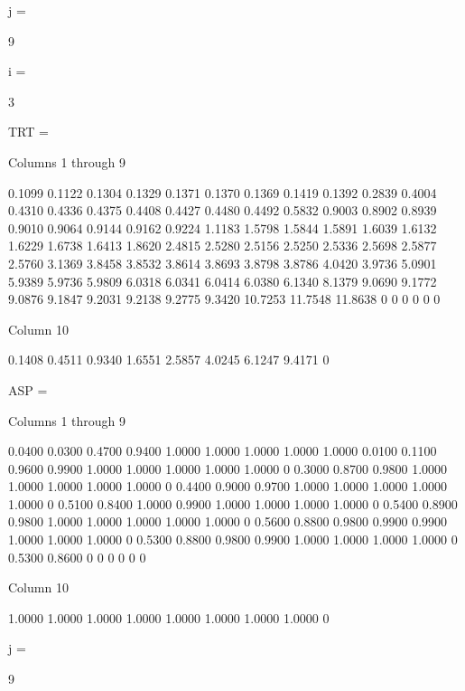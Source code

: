 j =

     9


i =

     3


TRT =

  Columns 1 through 9

    0.1099    0.1122    0.1304    0.1329    0.1371    0.1370    0.1369    0.1419    0.1392
    0.2839    0.4004    0.4310    0.4336    0.4375    0.4408    0.4427    0.4480    0.4492
    0.5832    0.9003    0.8902    0.8939    0.9010    0.9064    0.9144    0.9162    0.9224
    1.1183    1.5798    1.5844    1.5891    1.6039    1.6132    1.6229    1.6738    1.6413
    1.8620    2.4815    2.5280    2.5156    2.5250    2.5336    2.5698    2.5877    2.5760
    3.1369    3.8458    3.8532    3.8614    3.8693    3.8798    3.8786    4.0420    3.9736
    5.0901    5.9389    5.9736    5.9809    6.0318    6.0341    6.0414    6.0380    6.1340
    8.1379    9.0690    9.1772    9.0876    9.1847    9.2031    9.2138    9.2775    9.3420
   10.7253   11.7548   11.8638         0         0         0         0         0         0

  Column 10

    0.1408
    0.4511
    0.9340
    1.6551
    2.5857
    4.0245
    6.1247
    9.4171
         0


ASP =

  Columns 1 through 9

    0.0400    0.0300    0.4700    0.9400    1.0000    1.0000    1.0000    1.0000    1.0000
    0.0100    0.1100    0.9600    0.9900    1.0000    1.0000    1.0000    1.0000    1.0000
         0    0.3000    0.8700    0.9800    1.0000    1.0000    1.0000    1.0000    1.0000
         0    0.4400    0.9000    0.9700    1.0000    1.0000    1.0000    1.0000    1.0000
         0    0.5100    0.8400    1.0000    0.9900    1.0000    1.0000    1.0000    1.0000
         0    0.5400    0.8900    0.9800    1.0000    1.0000    1.0000    1.0000    1.0000
         0    0.5600    0.8800    0.9800    0.9900    0.9900    1.0000    1.0000    1.0000
         0    0.5300    0.8800    0.9800    0.9900    1.0000    1.0000    1.0000    1.0000
         0    0.5300    0.8600         0         0         0         0         0         0

  Column 10

    1.0000
    1.0000
    1.0000
    1.0000
    1.0000
    1.0000
    1.0000
    1.0000
         0


j =

     9


